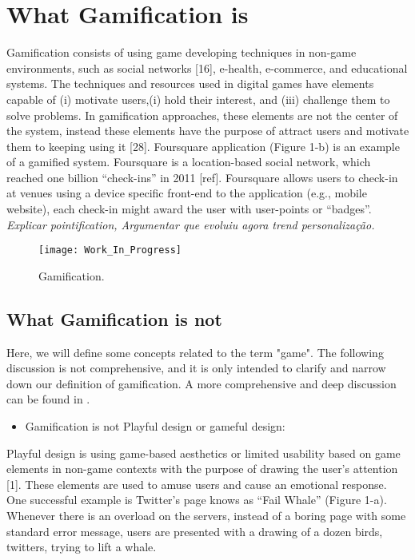 \section{What Gamification is}

Gamification consists of using game developing techniques in
non-game environments, such as social networks [16], e-health, e-commerce, and educational systems. The techniques and resources used in digital games have elements
capable of (i) motivate users,(i) hold their interest, and (iii) challenge them
to solve problems. In gamification approaches, these elements are
not the center of the system, instead these elements have the purpose of attract users and motivate them to keeping using it [28]. Foursquare application (Figure 1-b) is an
example of a gamified system. Foursquare is a location-based
social network, which reached one billion “check-ins” in 2011 [ref].
Foursquare allows users to check-in at venues using a device specific
front-end to the application (e.g., mobile website), each
check-in might award the user with user-points or “badges”. 
\textit{Explicar pointification, 
Argumentar que evoluiu agora trend personalização.}

\begin{figure}[h!]
\caption{Gamification.}
\centering
\texttt{[image: Work\_In\_Progress]}
\label{fig:work_in_progress}
\end{figure}

\subsection{What Gamification is not}

Here, we will define some concepts related to the term "game". The following discussion is not comprehensive, and it is only intended to clarify and narrow down our definition of gamification. A more comprehensive and deep discussion can be found in \citeauthor{Deterding2011}.

\begin{itemize}
\item Gamification is not Playful design or gameful design:
\end{itemize}

Playful design is using game-based aesthetics or limited usability
based on game elements in non-game contexts with the purpose of
drawing the user's attention [1]. These elements are used to amuse
users and cause an emotional response. One successful example is
Twitter’s page knows as “Fail Whale” (Figure 1-a). Whenever
there is an overload on the servers, instead of a boring page with
some standard error message, users are presented with a drawing of
a dozen birds, twitters, trying to lift a whale.

